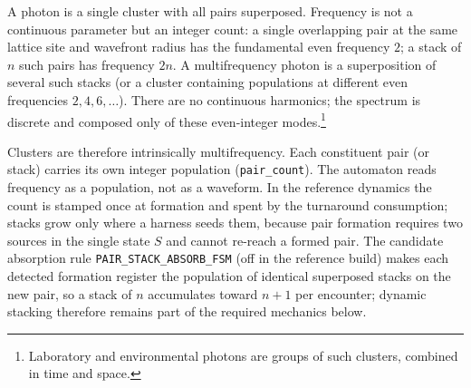 \documentclass{ijuc}
\begin{document}
A photon is a single cluster with all pairs superposed. Frequency is not a continuous parameter but an integer count: a single overlapping pair at the same lattice site and wavefront radius has the fundamental even frequency $2$; a stack of $n$ such pairs has frequency $2n$. A multifrequency photon is a superposition of several such stacks (or a cluster containing populations at different even frequencies $2,4,6,\dots$). There are no continuous harmonics; the spectrum is discrete and composed only of these even-integer modes.\footnote{Laboratory and environmental photons are groups of such clusters, combined in time and space.}

Clusters are therefore intrinsically multifrequency. Each constituent pair (or stack) carries its own integer population (\texttt{pair\_count}). The automaton reads frequency as a population, not as a waveform. In the reference dynamics the count is stamped once at formation and spent by the turnaround consumption; stacks grow only where a harness seeds them, because pair formation requires two sources in the single state $S$ and cannot re-reach a formed pair. The candidate absorption rule \texttt{PAIR\_STACK\_ABSORB\_FSM} (off in the reference build) makes each detected formation register the population of identical superposed stacks on the new pair, so a stack of $n$ accumulates toward $n+1$ per encounter; dynamic stacking therefore remains part of the required mechanics below.
\end{document}
